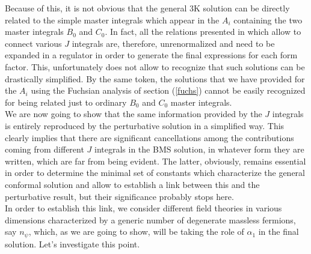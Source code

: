 \documentclass[a4paper,11pt,openright,twoside]{book}
\numberwithin{equation}{section}
\begin{document}
{{Because of this, it is not obvious that the general 3K solution can be directly related to the simple master integrals which appear in the $A_i$ containing the two master integrals $B_0$ and $C_0$. In fact, all the relations presented in \cite{Bzowski:2013sza} which allow to connect various $J$ integrals are, therefore, unrenormalized and need to be expanded in a regulator in order to generate the final expressions for each form factor. This, unfortunately does not allow to recognize that such solutions can be drastically simplified. By the same token, the solutions that we have provided for the $A_i$ using the Fuchsian analysis of section (\ref{fuchs}) cannot be easily recognized for being related just to ordinary $B_0$ and $C_0$ master integrals. \\
We are now going to show that the same information provided by the $J$ integrals is entirely reproduced by the perturbative solution in a simplified way. This clearly implies that 
there are significant cancellations among the contributions coming from different $J$ integrals in the BMS solution, in whatever form they are written, which are far from being evident. The latter, obviously, remains essential in order to determine the minimal set of constants which characterize the general conformal solution and allow to establish a link between this and the perturbative result, but their significance probably stops here.   \\
In order to establish this link, we consider different field theories in various dimensions characterized by a generic 
number of degenerate massless fermions, say $n_\psi$, which, as we are going to show, will be taking the role of $\alpha_1$ in the final solution. Let's investigate this point.

}}
\end{document}
